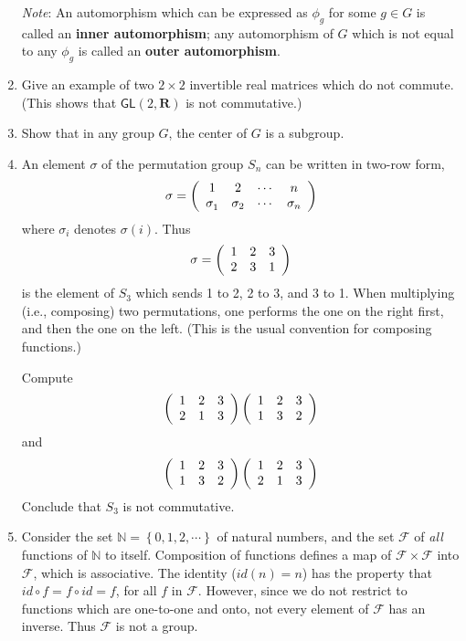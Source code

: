 \documentclass[12pt]{amsbook}
\theoremstyle{plain}
\numberwithin{equation}{chapter}
\numberwithin{theorem}{chapter}
\begin{document}
\begin{enumerate}
\textit{Note}: An automorphism which can be expressed as $\phi_{g}$ for some
$g\in G$ is called an \textbf{inner automorphism}; any automorphism of $G$
which is not equal to any $\phi_{g}$ is called an \textbf{outer automorphism}.

\item \label{gl2}Give an example of two $2\times2$ invertible real matrices
which do not commute. (This shows that $\mathsf{GL}(2,\mathbf{R})$ is not commutative.)

\item  Show that in any group $G$, the center of $G$ is a subgroup.

\item \label{sn}An element $\sigma$ of the permutation group $S_{n}$ can be
written in two-row form,
\[
\sigma=\left(
\begin{array}
[c]{cccc}%
1 & 2 & \cdots &  n\\
\sigma_{1}^{{}} & \sigma_{2} & \cdots & \sigma_{n}%
\end{array}
\right)
\]
where $\sigma_{i}$ denotes $\sigma(i)$. Thus
\[
\sigma=\left(
\begin{array}
[c]{ccc}%
1 & 2 & 3\\
2 & 3 & 1
\end{array}
\right)
\]
is the element of $S_{3}$ which sends 1 to 2, 2 to 3, and 3 to 1. When
multiplying (i.e., composing) two permutations, one performs the one on the
right first, and then the one on the left. (This is the usual convention for
composing functions.)

Compute
\[
\left(
\begin{array}
[c]{ccc}%
1 & 2 & 3\\
2 & 1 & 3
\end{array}
\right)  \left(
\begin{array}
[c]{ccc}%
1 & 2 & 3\\
1 & 3 & 2
\end{array}
\right)
\]
and
\[
\left(
\begin{array}
[c]{ccc}%
1 & 2 & 3\\
1 & 3 & 2
\end{array}
\right)  \left(
\begin{array}
[c]{ccc}%
1 & 2 & 3\\
2 & 1 & 3
\end{array}
\right)
\]
Conclude that $S_{3}$ is not commutative.

\item \label{counter-example}Consider the set $\mathbb{N}\mathbf{=}\left\{
0,1,2,\cdots\right\}  $ of natural numbers, and the set $\mathcal{F}$ of
\textit{all} functions of $\mathbb{N}$ to itself. Composition of functions
defines a map of $\mathcal{F}\times\mathcal{F}$ into $\mathcal{F}$, which is
associative. The identity ($id(n)=n$) has the property that $id\circ f=f\circ
id=f$, for all $f$ in $\mathcal{F}$. However, since we do not restrict to
functions which are one-to-one and onto, not every element of $\mathcal{F}$
has an inverse. Thus $\mathcal{F}$ is not a group.


\end{enumerate}
\end{document}
